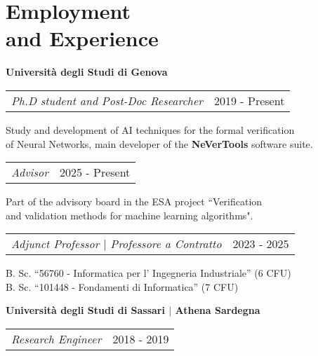 \section{\sc Employment \\and Experience}

{\bf{Universit\`a degli Studi di Genova}}\\
\begin{tabular}{@{}p{4in}p{2in}}
	\textit{Ph.D student and Post-Doc Researcher} & 2019 - Present\\
\end{tabular}

\begin{list1}
	\item[] Study and development of AI techniques for the formal verification\\
	of Neural Networks, main developer of the \textbf{NeVerTools} software suite.
\end{list1}

\begin{tabular}{@{}p{4in}p{2in}}
	\textit{Advisor} & 2025 - Present\\
\end{tabular}

\begin{list1}
	\item[] Part of the advisory board in the ESA project ``Verification\\
	and validation methods for machine learning algorithms".
\end{list1}

\begin{tabular}{@{}p{4in}p{2in}}
	\textit{Adjunct Professor $\vert$ Professore a Contratto} & 2023 - 2025\\
\end{tabular}

\begin{list1}
	\item[] B. Sc. ``56760 - Informatica per l' Ingegneria Industriale'' (6 CFU)\\
	B. Sc. ``101448 - Fondamenti di Informatica'' (7 CFU)\\
\end{list1}

{\bf{Universit\`a degli Studi di Sassari $\vert$ Athena Sardegna}}\\
\begin{tabular}{@{}p{4in}p{2in}}
	\textit{Research Engineer} & 2018 - 2019\\
\end{tabular}

